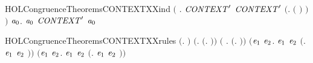 \begin{SaveVerbatim}{HOLCongruenceTheoremsCONTEXTXXind}
       \ensuremath{(}\HOLSymConst{\HOLTokenForall{}} . \ensuremath{\HOLBoundVar{CONTEXT}\sp{\prime}}  \HOLSymConst{\HOLTokenImp{}} \ensuremath{\HOLBoundVar{CONTEXT}\sp{\prime}} \ensuremath{(}\HOLTokenLambda{}.  \ensuremath{(} \ensuremath{)} \ensuremath{)}\ensuremath{)} \HOLSymConst{\HOLTokenImp{}}
       \HOLSymConst{\HOLTokenForall{}}\ensuremath{\HOLBoundVar{a}\sb{\mathrm{0}}}.  \ensuremath{\HOLBoundVar{a}\sb{\mathrm{0}}} \HOLSymConst{\HOLTokenImp{}} \ensuremath{\HOLBoundVar{CONTEXT}\sp{\prime}} \ensuremath{\HOLBoundVar{a}\sb{\mathrm{0}}}
\end{SaveVerbatim}
\newcommand{\HOLCongruenceTheoremsCONTEXTXXind}{\UseVerbatim{HOLCongruenceTheoremsCONTEXTXXind}}
\begin{SaveVerbatim}{HOLCongruenceTheoremsCONTEXTXXrules}
\HOLTokenTurnstile{}  \ensuremath{(}\HOLTokenLambda{}. \ensuremath{)} \HOLSymConst{\HOLTokenConj{}} \ensuremath{(}\HOLSymConst{\HOLTokenForall{}}.  \ensuremath{(}\HOLTokenLambda{}. \ensuremath{)}\ensuremath{)} \HOLSymConst{\HOLTokenConj{}}
   \ensuremath{(}\HOLSymConst{\HOLTokenForall{}} .   \HOLSymConst{\HOLTokenImp{}}  \ensuremath{(}\HOLTokenLambda{}. \HOLSymConst{\ensuremath{\ldotp}} \ensuremath{)}\ensuremath{)} \HOLSymConst{\HOLTokenConj{}}
   \ensuremath{(}\HOLSymConst{\HOLTokenForall{}}\ensuremath{\HOLBoundVar{e}\sb{\mathrm{1}}} \ensuremath{\HOLBoundVar{e}\sb{\mathrm{2}}}.  \ensuremath{\HOLBoundVar{e}\sb{\mathrm{1}}} \HOLSymConst{\HOLTokenConj{}}  \ensuremath{\HOLBoundVar{e}\sb{\mathrm{2}}} \HOLSymConst{\HOLTokenImp{}}  \ensuremath{(}\HOLTokenLambda{}. \ensuremath{\HOLBoundVar{e}\sb{\mathrm{1}}}  \HOLSymConst{\ensuremath{+}} \ensuremath{\HOLBoundVar{e}\sb{\mathrm{2}}} \ensuremath{)}\ensuremath{)} \HOLSymConst{\HOLTokenConj{}}
   \ensuremath{(}\HOLSymConst{\HOLTokenForall{}}\ensuremath{\HOLBoundVar{e}\sb{\mathrm{1}}} \ensuremath{\HOLBoundVar{e}\sb{\mathrm{2}}}.  \ensuremath{\HOLBoundVar{e}\sb{\mathrm{1}}} \HOLSymConst{\HOLTokenConj{}}  \ensuremath{\HOLBoundVar{e}\sb{\mathrm{2}}} \HOLSymConst{\HOLTokenImp{}}  \ensuremath{(}\HOLTokenLambda{}. \ensuremath{\HOLBoundVar{e}\sb{\mathrm{1}}}  \HOLSymConst{\ensuremath{\mid}} \ensuremath{\HOLBoundVar{e}\sb{\mathrm{2}}} \ensuremath{)}\ensuremath{)} \HOLSymConst{\HOLTokenConj{}}

\end{SaveVerbatim}
